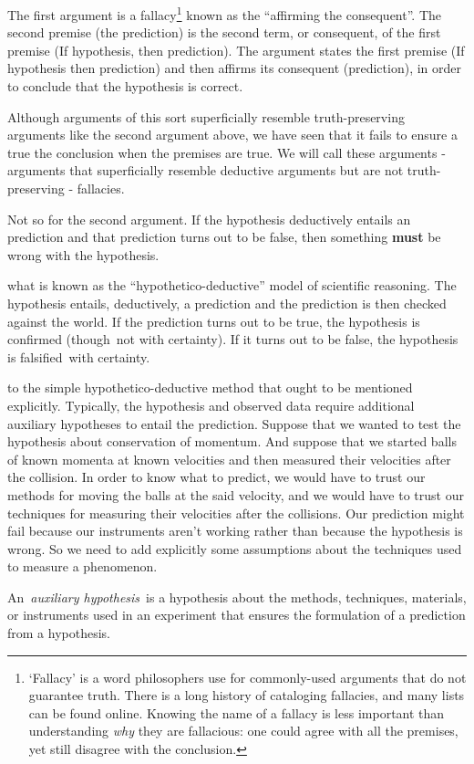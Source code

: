 \begin{refsection}
The first argument is a fallacy\footnote{`Fallacy' is a word philosophers use for commonly-used arguments that do not guarantee truth. There is a long history of cataloging fallacies, and many lists can be found online. Knowing the name of a fallacy is less important than understanding \emph{why} they are fallacious: one could agree with all the premises, yet still disagree with the conclusion.} known as the ``affirming the consequent''. The second premise (the prediction) is the second term, or consequent, of the first premise (If hypothesis, then prediction). The argument states the first premise (If hypothesis then prediction) and then affirms its consequent (prediction), in order to conclude that the hypothesis is correct. 

Although arguments of this sort superficially resemble truth-preserving arguments like the second argument above, we have seen that it fails to ensure a true the conclusion when the premises are true. We will call these arguments - arguments that superficially resemble deductive arguments but are not truth-preserving - fallacies.

Not so for the second argument. If the hypothesis deductively entails an prediction and that prediction turns out to be false, then something \textbf{must} be wrong with the hypothesis. 

 what is known as the ``hypothetico-deductive'' model of scientific reasoning. The hypothesis entails, deductively, a prediction and the prediction is then checked against the world. If the prediction turns out to be true, the hypothesis is confirmed (though not with certainty). If it turns out to be false, the hypothesis is falsified with certainty. 


 to the simple hypothetico-deductive method that ought to be mentioned explicitly. Typically, the hypothesis and observed data require additional auxiliary hypotheses to entail the prediction. Suppose that we wanted to test the hypothesis about conservation of momentum. And suppose that we started balls of known momenta at known velocities and then measured their velocities after the collision. In order to know what to predict, we would have to trust our methods for moving the balls at the said velocity, and we would have to trust our techniques for measuring their velocities after the collisions. Our prediction might fail because our instruments aren't working rather than because the hypothesis is wrong. So we need to add explicitly some assumptions about the techniques used to measure a phenomenon.\begin{thesis}\label{thesis:auxiliaryhypothesis}
An \emph{auxiliary hypothesis} is a hypothesis about the methods, techniques, materials, or instruments used in an experiment that ensures the formulation of a prediction from a hypothesis.\end{thesis}


\end{refsection}
